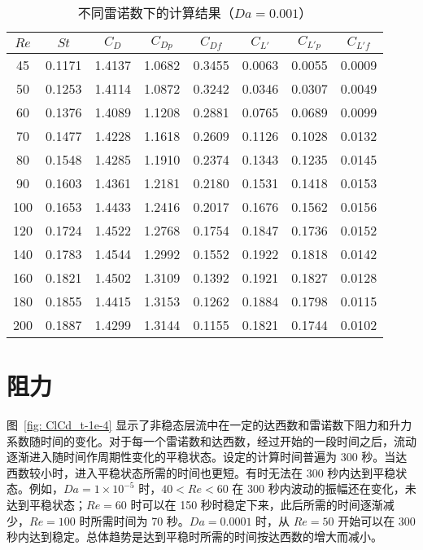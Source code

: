 \begin{table}[ht]
	\caption{不同雷诺数下的计算结果（$Da=0.001$）}\label{tab: results-1e-3}
	\vspace{.5em}\centering\wuhao
	\begin{tabular}{*{8}{c}}
		\toprule[1.5pt]
		$Re$ & $St$ & $C_D$ & $C_{Dp}$ & $C_{Df}$ & $C_{L'}$ & $C_{L'p}$ & $C_{L'f}$ \\
		\midrule[1pt]
		45  & 0.1171 & 1.4137 & 1.0682 & 0.3455 & 0.0063 & 0.0055 & 0.0009 \\
		50  & 0.1253 & 1.4114 & 1.0872 & 0.3242 & 0.0346 & 0.0307 & 0.0049 \\
		60  & 0.1376 & 1.4089 & 1.1208 & 0.2881 & 0.0765 & 0.0689 & 0.0099 \\
		70  & 0.1477 & 1.4228 & 1.1618 & 0.2609 & 0.1126 & 0.1028 & 0.0132 \\
		80  & 0.1548 & 1.4285 & 1.1910 & 0.2374 & 0.1343 & 0.1235 & 0.0145 \\
		90  & 0.1603 & 1.4361 & 1.2181 & 0.2180 & 0.1531 & 0.1418 & 0.0153 \\
		100 & 0.1653 & 1.4433 & 1.2416 & 0.2017 & 0.1676 & 0.1562 & 0.0156 \\
		120 & 0.1724 & 1.4522 & 1.2768 & 0.1754 & 0.1847 & 0.1736 & 0.0152 \\
		140 & 0.1783 & 1.4544 & 1.2992 & 0.1552 & 0.1922 & 0.1818 & 0.0142 \\
		160 & 0.1821 & 1.4502 & 1.3109 & 0.1392 & 0.1921 & 0.1827 & 0.0128 \\
		180 & 0.1855 & 1.4415 & 1.3153 & 0.1262 & 0.1884 & 0.1798 & 0.0115 \\
		200 & 0.1887 & 1.4299 & 1.3144 & 0.1155 & 0.1821 & 0.1744 & 0.0102 \\
		\bottomrule[1.5pt]
	\end{tabular}
\end{table}

\section{阻力}\label{sec: drag}

图~\ref{fig: ClCd_t-1e-4} 显示了非稳态层流中在一定的达西数和雷诺数下阻力和升力系数随时间的变化。对于每一个雷诺数和达西数，经过开始的一段时间之后，流动逐渐进入随时间作周期性变化的平稳状态。设定的计算时间普遍为 300 秒。当达西数较小时，进入平稳状态所需的时间也更短。有时无法在 300 秒内达到平稳状态。例如，$Da=1\times 10^{-5}$ 时，$40<Re<60$ 在 300 秒内波动的振幅还在变化，未达到平稳状态；$Re=60$ 时可以在 150 秒时稳定下来，此后所需的时间逐渐减少，$Re=100$ 时所需时间为 70 秒。$Da=0.0001$ 时，从 $Re=50$ 开始可以在 300 秒内达到稳定。总体趋势是达到平稳时所需的时间按达西数的增大而减小。


